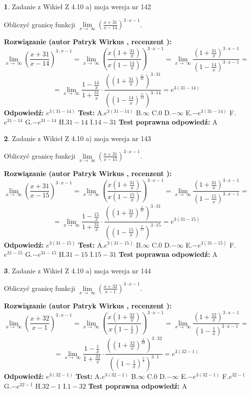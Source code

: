 \documentclass[12pt, a4paper]{article}
\theoremstyle{definition} %
\newtheorem{zad}{}
\newcommand{\zadStart}[1]{\begin{zad}#1\newline}
\newcommand{\zadStop}{\end{zad}}
\newcommand{\rozwStart}[2]{\noindent \textbf{Rozwiązanie (autor #1 , recenzent #2): }\newline}
\newcommand{\rozwStop}{\newline}
\newcommand{\odpStart}{\noindent \textbf{Odpowiedź:}\newline}
\newcommand{\odpStop}{\newline}
\newcommand{\testStart}{\noindent \textbf{Test:}\newline}
\newcommand{\testStop}{\newline}
\newcommand{\kluczStart}{\noindent \textbf{Test poprawna odpowiedź:}\newline}
\newcommand{\kluczStop}{\newline}
\begin{document}
\zadStart{Zadanie z Wikieł Z 4.10 a) moja wersja nr 142}


Obliczyć granicę funkcji  $\lim\limits_{x\to\ \infty}(\frac{x+31}{x-14})^{3\cdot x-1}$.
\zadStop
\rozwStart{Patryk Wirkus}{}
$$\lim\limits_{x\to\ \infty}(\frac{x+31}{x-14})^{3\cdot x-1} = \lim\limits_{x\to\ \infty}(\frac{x(1+\frac{31}{x})}{x(1-\frac{14}{x})})^{3\cdot x-1}=\lim\limits_{x\to\ \infty}\frac{(1+\frac{31}{x})^{3\cdot x-1}}{(1-\frac{14}{x})^{3\cdot x-1}}=$$
$$=\lim\limits_{x\to\ \infty}\frac{1-\frac{14}{x}}{1+\frac{31}{x}}\cdot\frac{((1+\frac{31}{x})^{\frac{x}{31}})^{3\cdot31}}{((1-\frac{14}{x})^{\frac{x}{14}})^{3\cdot14}}=e^{3(31-14)}$$
\rozwStop
\odpStart
$e^{3(31-14)}$
\odpStop
\testStart
A.$e^{3(31-14)}$ B.$\infty$ C.$0$ D.$-\infty$ E.$-e^{3(31-14)}$
F.$e^{31-14}$ G.$-e^{31-14}$
H.$31-14$
I.$14-31$
\testStop
\kluczStart
A
\kluczStop



\zadStart{Zadanie z Wikieł Z 4.10 a) moja wersja nr 143}


Obliczyć granicę funkcji  $\lim\limits_{x\to\ \infty}(\frac{x+31}{x-15})^{3\cdot x-1}$.
\zadStop
\rozwStart{Patryk Wirkus}{}
$$\lim\limits_{x\to\ \infty}(\frac{x+31}{x-15})^{3\cdot x-1} = \lim\limits_{x\to\ \infty}(\frac{x(1+\frac{31}{x})}{x(1-\frac{15}{x})})^{3\cdot x-1}=\lim\limits_{x\to\ \infty}\frac{(1+\frac{31}{x})^{3\cdot x-1}}{(1-\frac{15}{x})^{3\cdot x-1}}=$$
$$=\lim\limits_{x\to\ \infty}\frac{1-\frac{15}{x}}{1+\frac{31}{x}}\cdot\frac{((1+\frac{31}{x})^{\frac{x}{31}})^{3\cdot31}}{((1-\frac{15}{x})^{\frac{x}{15}})^{3\cdot15}}=e^{3(31-15)}$$
\rozwStop
\odpStart
$e^{3(31-15)}$
\odpStop
\testStart
A.$e^{3(31-15)}$ B.$\infty$ C.$0$ D.$-\infty$ E.$-e^{3(31-15)}$
F.$e^{31-15}$ G.$-e^{31-15}$
H.$31-15$
I.$15-31$
\testStop
\kluczStart
A
\kluczStop



\zadStart{Zadanie z Wikieł Z 4.10 a) moja wersja nr 144}


Obliczyć granicę funkcji  $\lim\limits_{x\to\ \infty}(\frac{x+32}{x-1})^{3\cdot x-1}$.
\zadStop
\rozwStart{Patryk Wirkus}{}
$$\lim\limits_{x\to\ \infty}(\frac{x+32}{x-1})^{3\cdot x-1} = \lim\limits_{x\to\ \infty}(\frac{x(1+\frac{32}{x})}{x(1-\frac{1}{x})})^{3\cdot x-1}=\lim\limits_{x\to\ \infty}\frac{(1+\frac{32}{x})^{3\cdot x-1}}{(1-\frac{1}{x})^{3\cdot x-1}}=$$
$$=\lim\limits_{x\to\ \infty}\frac{1-\frac{1}{x}}{1+\frac{32}{x}}\cdot\frac{((1+\frac{32}{x})^{\frac{x}{32}})^{3\cdot32}}{((1-\frac{1}{x})^{\frac{x}{1}})^{3\cdot1}}=e^{3(32-1)}$$
\rozwStop
\odpStart
$e^{3(32-1)}$
\odpStop
\testStart
A.$e^{3(32-1)}$ B.$\infty$ C.$0$ D.$-\infty$ E.$-e^{3(32-1)}$
F.$e^{32-1}$ G.$-e^{32-1}$
H.$32-1$
I.$1-32$
\testStop
\kluczStart
A
\kluczStop
\end{document}
